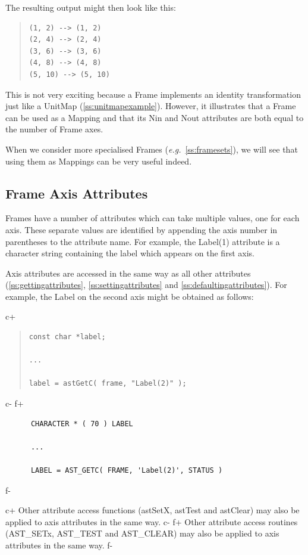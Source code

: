 \documentclass[twoside,11pt]{article}
\newcommand{\secref}[1]{\S\ref{#1}}
\renewcommand{\secref}[1]{\ref{#1}}
\begin{document}
The resulting output might then look like this:

\begin{quote}
\begin{verbatim}
(1, 2) --> (1, 2)
(2, 4) --> (2, 4)
(3, 6) --> (3, 6)
(4, 8) --> (4, 8)
(5, 10) --> (5, 10)
\end{verbatim}
\end{quote}

This is not very exciting because a Frame implements an identity
transformation just like a UnitMap
(\secref{ss:unitmapexample}). However, it illustrates that a Frame can
be used as a Mapping and that its Nin and Nout attributes are both
equal to the number of Frame axes.

When we consider more specialised Frames
({\em{e.g.}}~\secref{ss:framesets}), we will see that using them as
Mappings can be very useful indeed.

\subsection{\label{ss:frameaxisattributes}Frame Axis Attributes}

Frames have a number of attributes which can take multiple values, one
for each axis. These separate values are identified by appending the
axis number in parentheses to the attribute name. For example, the
Label(1) attribute is a character string containing the label which
appears on the first axis.

Axis attributes are accessed in the same way as all other attributes
(\secref{ss:gettingattributes}, \secref{ss:settingattributes} and
\secref{ss:defaultingattributes}). For example, the Label on the second
axis might be obtained as follows:

c+
\begin{quote}
\small
\begin{verbatim}
const char *label;

...

label = astGetC( frame, "Label(2)" );
\end{verbatim}
\normalsize
\end{quote}
c-
f+
\small
\begin{verbatim}
      CHARACTER * ( 70 ) LABEL

      ...

      LABEL = AST_GETC( FRAME, 'Label(2)', STATUS )
\end{verbatim}
\normalsize
f-

c+
Other attribute access functions (astSetX, astTest and astClear) may
also be applied to axis attributes in the same way.
c-
f+
Other attribute access routines (AST\_SETx, AST\_TEST and AST\_CLEAR)
may also be applied to axis attributes in the same way.
f-
\end{document}
